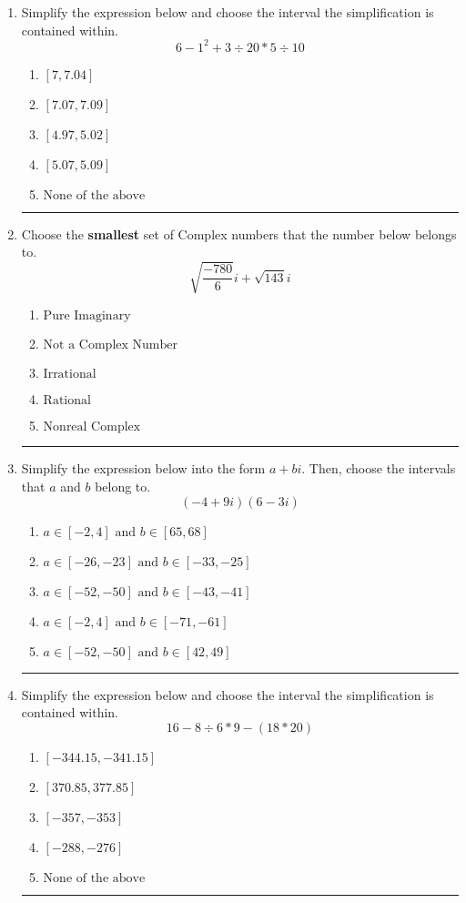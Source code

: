 \documentclass[14pt]{extbook}
\newcommand{\litem}[1]{\item#1\hspace*{-1cm}\rule{\textwidth}{0.4pt}}
\begin{document}
\begin{enumerate}
{\begin{enumerate}[label=\Alph*.]
\end{enumerate} }
\litem{
Simplify the expression below and choose the interval the simplification is contained within.\[ 6 - 1^2 + 3 \div 20 * 5 \div 10 \]\begin{enumerate}[label=\Alph*.]
\item \( [7, 7.04] \)
\item \( [7.07, 7.09] \)
\item \( [4.97, 5.02] \)
\item \( [5.07, 5.09] \)
\item \( \text{None of the above} \)

\end{enumerate} }
\litem{
Choose the \textbf{smallest} set of Complex numbers that the number below belongs to.\[ \sqrt{\frac{-780}{6}} i+\sqrt{143}i \]\begin{enumerate}[label=\Alph*.]
\item \( \text{Pure Imaginary} \)
\item \( \text{Not a Complex Number} \)
\item \( \text{Irrational} \)
\item \( \text{Rational} \)
\item \( \text{Nonreal Complex} \)

\end{enumerate} }
\litem{
Simplify the expression below into the form $a+bi$. Then, choose the intervals that $a$ and $b$ belong to.\[ (-4 + 9 i)(6 - 3 i) \]\begin{enumerate}[label=\Alph*.]
\item \( a \in [-2, 4] \text{ and } b \in [65, 68] \)
\item \( a \in [-26, -23] \text{ and } b \in [-33, -25] \)
\item \( a \in [-52, -50] \text{ and } b \in [-43, -41] \)
\item \( a \in [-2, 4] \text{ and } b \in [-71, -61] \)
\item \( a \in [-52, -50] \text{ and } b \in [42, 49] \)

\end{enumerate} }
\litem{
Simplify the expression below and choose the interval the simplification is contained within.\[ 16 - 8 \div 6 * 9 - (18 * 20) \]\begin{enumerate}[label=\Alph*.]
\item \( [-344.15, -341.15] \)
\item \( [370.85, 377.85] \)
\item \( [-357, -353] \)
\item \( [-288, -276] \)
\item \( \text{None of the above} \)


\end{enumerate}}
\end{enumerate}
\end{document}
